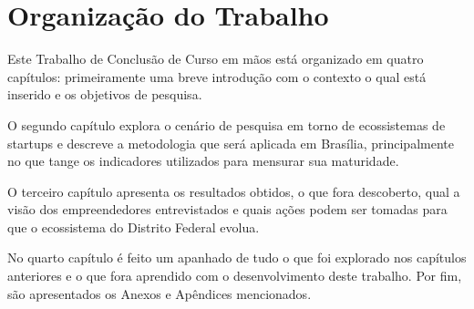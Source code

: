 \section{Organização do Trabalho}
\label{section:organizacao_do_trabalho}

Este Trabalho de Conclusão de Curso em mãos está organizado em quatro capítulos: primeiramente uma breve introdução com o contexto o qual está inserido e os objetivos de pesquisa.

O segundo capítulo explora o cenário de pesquisa em torno de ecossistemas de startups e descreve a metodologia que será aplicada em Brasília, principalmente no que tange os indicadores utilizados para mensurar sua maturidade.

O terceiro capítulo apresenta os resultados obtidos, o que fora descoberto, qual a visão dos empreendedores entrevistados e quais ações podem ser tomadas para que o ecossistema do Distrito Federal evolua.

No quarto capítulo é feito um apanhado de tudo o que foi explorado nos capítulos anteriores e o que fora aprendido com o desenvolvimento deste trabalho. Por fim, são apresentados os Anexos e Apêndices mencionados.
